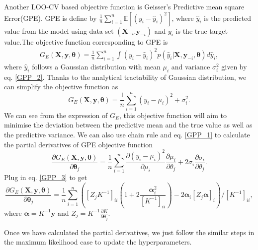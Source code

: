 \documentclass[11pt,a4paper]{article}
\theoremstyle{definition}
\numberwithin{equation}{section}
\let\vec\mathbf
\begin{document}
Another LOO-CV based objective function is Geisser's Predictive mean square Error(GPE)\cite[Geisser and Eddy]{Geisser_Eddy}\cite[Sundararajan and Keerthi]{Sundararajan_Keerthi}. GPE is define by $\frac{1}{n}\sum_{i=1}^{n}\mathbb E[(y_i-\hat{y}_i)^2]$, where $\hat{y}_i$ is the predicted value from the model using data set $(\vec X_{-i}.\vec y_{-i})$ and $y_i$ is the true target value.The objective function corresponding to GPE is
\begin{equation}\label{GPE}
\begin{split}
G_E(\vec X,\vec y, \vec \theta) = \frac{1}{n}\sum_{i=1}^{n}\int (y_i-\hat{y}_i)^2 p(\hat y_i|\vec X,\vec y_{-i},\vec \theta)d\hat y_i,
\end{split}
\end{equation}
where $\hat y_i$ follows a Gaussian distribution with mean $\mu_i$ and variance $\sigma^2_i$ given by eq. \ref{GPP_2}. Thanks to the analytical tractability of Gaussian distribution, we can simplify the objective function as 
\begin{equation}\label{GPE_1}
G_E(\vec X,\vec y, \vec \theta) = \frac{1}{n}\sum_{i=1}^{n}(y_i-\mu_i)^2+\sigma^2_i.
\end{equation}
We can see from the expression of $G_E$, this objective function will aim to minimise the deviation between the predictive mean and the true value as well as the predictive variance. We can also use chain rule and eq. \ref{GPP_1} to calculate the partial derivatives of GPE objective function
\begin{equation}\label{GPE_derivative}
\frac{\partial G_E(\vec X,\vec y, \vec \theta)}{\partial \vec \theta_j} = \frac{1}{n}\sum_{i=1}^{n}\frac{\partial (y_i-\mu_i)^2}{\partial \mu_i}\frac{\partial \mu_i}{\partial \theta_j}+2\sigma_i\frac{\partial \sigma_i}{\partial \theta_j}.
\end{equation}
Plug in eq. \ref{GPP_3} to get
\begin{equation}\label{GPE_derivative_2}
\frac{\partial G_E(\vec X,\vec y, \vec \theta)}{\partial \vec \theta_j} = \frac{1}{n}\sum_{i=1}^{n}\left([Z_j K^{-1}]_{ii}\left(1+2\frac{\vec\alpha^2_i}{[K^{-1}]_{ii}}\right)-2\vec \alpha_i[Z_j\vec\alpha]_i\right)/[K^{-1}]_{ii},
\end{equation}
where $\vec \alpha = K^{-1}\vec y$ and $Z_j = K^{-1}\frac{\partial K}{\partial \vec \theta_j}$.

Once we have calculated the partial derivatives, we just follow the similar steps in the maximum likelihood case to update the hyperparameters.
\end{document}
